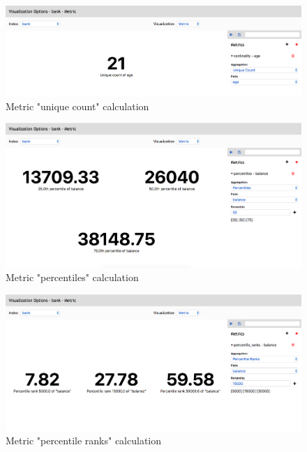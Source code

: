 \documentclass[a4paper, 12pt, english]{book}
\begin{document}
\begin{figure}
  \centering
  \includegraphics[width=13cm, keepaspectratio]{img/metric-unique-calculation.png}
  \caption{Metric "unique count" calculation}
  \label{fig:metric-unique-calcuation}
\end{figure}

\begin{figure}
  \centering
  \includegraphics[width=13cm, keepaspectratio]{img/metric-percentiles-calculation.png}
  \caption{Metric "percentiles" calculation}
  \label{fig:metric-percentiles-calcuation}
\end{figure}

\begin{figure}
  \centering
  \includegraphics[width=13cm, keepaspectratio]{img/metric-ranks-calculation.png}
  \caption{Metric "percentile ranks" calculation}
  \label{fig:metric-ranks-calcuation}
\end{figure}
\end{document}
